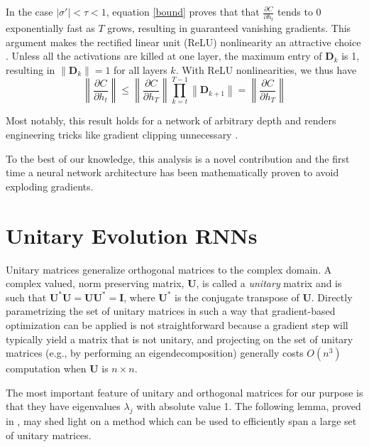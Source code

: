 \documentclass{article} %
\newcommand{\matr}[1]{\mathbf{#1}}
\newcommand\norm[1]{\left\lVert#1\right\rVert}
\begin{document}
In the case $|\sigma'| < \tau < 1$, equation \ref{bound} proves that 
that $\frac{\partial C}{\partial h_t}$ tends to 0 exponentially fast as $T$ grows, 
resulting in guaranteed vanishing gradients. 
This argument makes the rectified linear unit (ReLU) nonlinearity an attractive choice
\citep{Glorot2011, Nair2010}. Unless all the activations are killed at one layer, 
the maximum entry of $\matr{D}_k$ is 1, resulting in
$\norm{\matr{D}_k} = 1$ for all layers $k$. With ReLU nonlinearities, we thus have
\begin{equation}
  \norm{\frac{\partial C}{\partial h_t}} \leq \norm{ \frac{\partial C}{\partial h_T}} 
  \prod_{k=t}^{T-1} \norm{\matr{D}_{k+1}} = \norm{\frac{\partial C}{\partial h_T}}
\label{bound2}
\end{equation}

Most notably, this result holds for a network of arbitrary depth and renders engineering tricks
like gradient clipping unnecessary \citep{Pascanu2013}. 

To the best of our knowledge, this analysis is a novel contribution and the first time a 
neural network architecture has been mathematically proven to avoid exploding gradients. 

\vspace{-1mm}
\section{Unitary Evolution RNNs}
\label{sec:uRNN}
\vspace{-1mm}
Unitary matrices generalize orthogonal matrices to the complex domain.
A complex valued, norm preserving matrix,
$\matr{U}$, is called a \textit{unitary} matrix and is such that 
$\matr{U}^* \matr{U} = \matr{U} \matr{U}^* = \matr{I}$, where $\matr{U}^*$ is the conjugate transpose
of $\matr{U}$.  Directly parametrizing the set of unitary matrices in such a way that gradient-based
optimization can be applied is not straightforward because a gradient step will typically yield
a matrix that is not unitary, and projecting on the set of unitary matrices (e.g., by performing
an eigendecomposition) generally costs $O(n^3)$ computation when $\matr{U}$ is $n \times n$.

The most important feature of unitary and orthogonal matrices for our purpose is that they have eigenvalues
$\lambda_j$ with absolute value 1. The following lemma, proved in \cite{linalgbook}, may shed light on a 
method which can be used to efficiently span a large set of unitary matrices.
\end{document}
